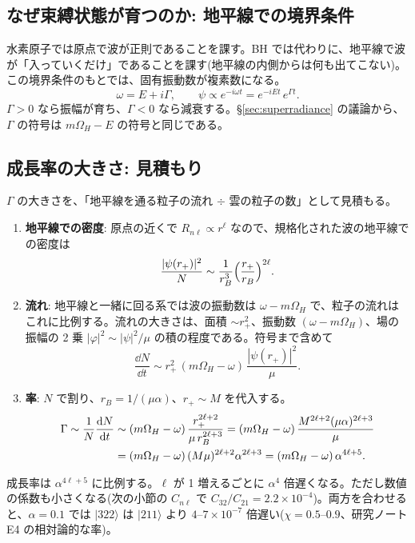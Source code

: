 \subsection{なぜ束縛状態が育つのか: 地平線での境界条件}

水素原子では原点で波が正則であることを課す。BH では代わりに、地平線で波が「入っていくだけ」であることを課す(地平線の内側からは何も出てこない)。この境界条件のもとでは、固有振動数が複素数になる。
\begin{equation}
\omega=E+i\Gamma,\qquad \psi\propto e^{-i\omega t}=e^{-iEt}\,e^{\Gamma t}.
\label{eq:complexomega}
\end{equation}
$\Gamma>0$ なら振幅が育ち、$\Gamma<0$ なら減衰する。\S\ref{sec:superradiance} の議論から、$\Gamma$ の符号は $m\Omega_H-E$ の符号と同じである。

\subsection{成長率の大きさ: 見積もり}

$\Gamma$ の大きさを、「地平線を通る粒子の流れ $\div$ 雲の粒子の数」として見積もる。
\begin{enumerate}
\item \textbf{地平線での密度}: 原点の近くで $R_{n\ell}\propto r^\ell$ なので、規格化された波の地平線での密度は
\[
\frac{|\psi(r_+)|^2}{N}\sim\frac{1}{r_B^3}\Bigl(\frac{r_+}{r_B}\Bigr)^{2\ell}.
\]
\item \textbf{流れ}: 地平線と一緒に回る系では波の振動数は $\omega-m\Omega_H$ で、粒子の流れはこれに比例する。流れの大きさは、面積 $\sim r_+^2$、振動数 $(\omega-m\Omega_H)$、場の振幅の 2 乗 $|\varphi|^2\sim|\psi|^2/\mu$ の積の程度である。符号まで含めて
\[
\frac{\dd N}{\dd t}\sim r_+^2\,(m\Omega_H-\omega)\,\frac{|\psi(r_+)|^2}{\mu}.
\]
\item \textbf{率}: $N$ で割り、$r_B=1/(\mu\alpha)$、$r_+\sim M$ を代入する。
\begin{align}
\Gamma\sim\frac{1}{N}\frac{\mathrm{d} N}{\mathrm{d} t}
&\sim(m\Omega_H-\omega)\,\frac{r_+^{2\ell+2}}{\mu\,r_B^{2\ell+3}}
=(m\Omega_H-\omega)\,\frac{M^{2\ell+2}(\mu\alpha)^{2\ell+3}}{\mu}\notag\\
&=(m\Omega_H-\omega)\,(M\mu)^{2\ell+2}\alpha^{2\ell+3}
=(m\Omega_H-\omega)\,\alpha^{4\ell+5}.
\label{eq:gamma_estimate}
\end{align}
\end{enumerate}
成長率は $\alpha^{4\ell+5}$ に比例する。$\ell$ が 1 増えるごとに $\alpha^4$ 倍遅くなる。ただし数値の係数も小さくなる(次の小節の $C_{n\ell}$ で $C_{32}/C_{21}=2.2\times10^{-4}$)。両方を合わせると、$\alpha=0.1$ では $|322\rangle$ は $|211\rangle$ より $4$--$7\times10^{-7}$ 倍遅い($\chi=0.5$--$0.9$、研究ノート E4 の相対論的な率)。

